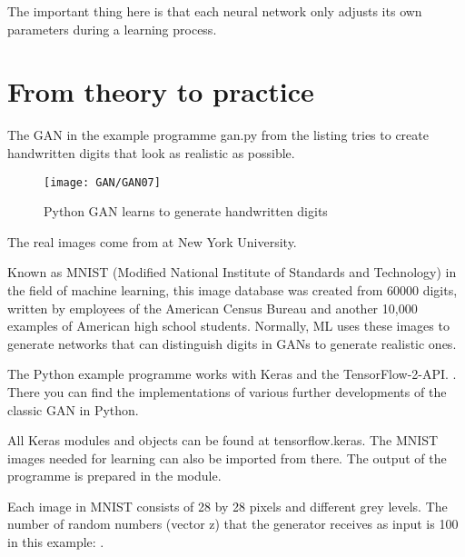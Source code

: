 \medskip


The important thing here is that each neural network only adjusts its own parameters during a learning process.

\section{From theory to practice}

The GAN in the example programme gan.py from the listing tries to create handwritten digits that look as realistic as possible.

\begin{figure}
  \texttt{[image: GAN/GAN07]}
  \caption{Python GAN learns to generate handwritten digits} 
  \label{GAN07}
\end{figure}

The real images come from   at New York University.

\begin{code}
  
  \caption{File } \label{code:gan}    
\end{code}    


Known as MNIST (Modified National Institute of Standards and Technology) in the field of machine learning, this image database was created from 60000 digits, written by employees of the American Census Bureau and another 10,000 examples of American high school students. Normally, ML uses these images to generate networks that can distinguish digits in GANs to generate realistic ones.

The Python example programme works with Keras and the TensorFlow-2-API.  . There you can find the implementations of various further developments of the classic GAN in Python.

All Keras modules and objects can be found at tensorflow.keras. The MNIST images needed for learning can also be imported from there. The output of the programme is prepared in the   module.

Each image in MNIST consists of 28 by 28 pixels and different grey levels. The number of random numbers (vector z) that the generator receives as input is 100 in this example: .

